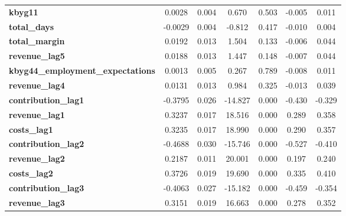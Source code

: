 \begin{center}
\begin{tabular}{lcccccc}
\textbf{kbyg11}                             &       0.0028  &        0.004     &     0.670  &         0.503        &       -0.005    &        0.011     \\
\textbf{total\_days}                        &      -0.0029  &        0.004     &    -0.812  &         0.417        &       -0.010    &        0.004     \\
\textbf{total\_margin}                      &       0.0192  &        0.013     &     1.504  &         0.133        &       -0.006    &        0.044     \\
\textbf{revenue\_lag5}                      &       0.0188  &        0.013     &     1.447  &         0.148        &       -0.007    &        0.044     \\
\textbf{kbyg44\_employment\_expectations}   &       0.0013  &        0.005     &     0.267  &         0.789        &       -0.008    &        0.011     \\
\textbf{revenue\_lag4}                      &       0.0131  &        0.013     &     0.984  &         0.325        &       -0.013    &        0.039     \\
\textbf{contribution\_lag1}                 &      -0.3795  &        0.026     &   -14.827  &         0.000        &       -0.430    &       -0.329     \\
\textbf{revenue\_lag1}                      &       0.3237  &        0.017     &    18.516  &         0.000        &        0.289    &        0.358     \\
\textbf{costs\_lag1}                        &       0.3235  &        0.017     &    18.990  &         0.000        &        0.290    &        0.357     \\
\textbf{contribution\_lag2}                 &      -0.4688  &        0.030     &   -15.746  &         0.000        &       -0.527    &       -0.410     \\
\textbf{revenue\_lag2}                      &       0.2187  &        0.011     &    20.001  &         0.000        &        0.197    &        0.240     \\
\textbf{costs\_lag2}                        &       0.3726  &        0.019     &    19.690  &         0.000        &        0.335    &        0.410     \\
\textbf{contribution\_lag3}                 &      -0.4063  &        0.027     &   -15.182  &         0.000        &       -0.459    &       -0.354     \\
\textbf{revenue\_lag3}                      &       0.3151  &        0.019     &    16.663  &         0.000        &        0.278    &        0.352     \\

\end{tabular}
\end{center}
